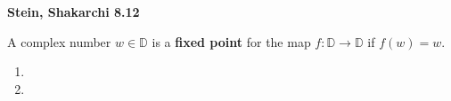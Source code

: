 \textbf{Stein, Shakarchi 8.12}

A complex number $w \in \mathbb{D}$ is a \textbf{fixed point} for the map $f : \mathbb{D} \to \mathbb{D}$ if $f(w) = w$.

\begin{enumerate}
  \item 
  \pagebreak
  \item 
\end{enumerate}
